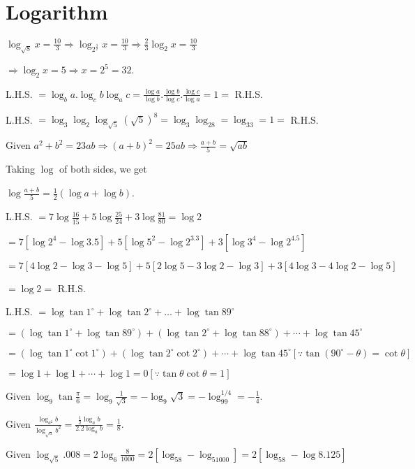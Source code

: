 \chapter{Logarithm}
\startitemize[n, 1*broad]
\item $\log_{\sqrt{8}}x = \frac{10}{3} \Rightarrow \log_{2^{\tfrac{3}{2}}}x = \frac{10}{3}\Rightarrow \frac{2}{3}\log_2x = \frac{10}{3}$

  $\Rightarrow \log_2x = 5 \Rightarrow x = 2^5 = 32.$
\item L.H.S. $= \log_ba.\log_cb\log_ac = \frac{\log a}{\log b}.\frac{\log b}{\log c}.\frac{\log c}{\log a} = 1 =$ R.H.S.
\item L.H.S. $= \log_3\log_2\log_{\sqrt{5}}(\sqrt{5})^8 = \log_3\log_28 = \log_33 = 1 =$ R.H.S.
\item Given $a^2 + b^2 = 23ab \Rightarrow (a + b)^2 = 25ab \Rightarrow \frac{a + b}{5} = \sqrt{ab}$

  Taking $\log$ of both sides, we get

  $\log\frac{a + b}{5} = \frac{1}{2}(\log a + \log b)$.
\item L.H.S. $= 7\log\frac{16}{15} + 5\log\frac{25}{24} + 3\log\frac{81}{80} = \log 2$

  $= 7[\log 2^4 - \log 3.5] + 5[\log 5^2 - \log 2^3.3] + 3[\log 3^4 - \log 2^4.5]$

  $= 7[4\log 2 - \log 3 - \log 5] + 5[2\log 5 - 3\log 2 - \log 3] + 3[4\log 3 - 4\log 2 - \log 5]$

  $= \log 2 =$ R.H.S.
\item L.H.S. $= \log\tan1^\circ + \log\tan2^\circ + \ldots + \log\tan89^\circ$

  $= (\log\tan1^\circ + \log\tan89^\circ) + (\log\tan2^\circ + \log\tan88^\circ) + \cdots + \log\tan45^\circ$

  $=(\log\tan1^\circ\cot1^\circ) + (\log\tan2^\circ\cot2^\circ) + \cdots + \log\tan45^\circ [\because \tan(90^\circ - \theta) =
  \cot\theta]$

  $= \log 1 + \log 1 + \cdots + \log 1 = 0 [\because \tan\theta\cot\theta = 1]$
\item Given $\log_9\tan\frac{\pi}{6} = \log_9\frac{1}{\sqrt{3}} = -\log_9\sqrt{3} = -\log_99^{1/4} = -\frac{1}{4}$.
\item Given $\frac{\log_{a^2}b}{\log_{\sqrt{a}}b^2} = \frac{\frac{1}{2}\log_ab}{2.2\log_ab} = \frac{1}{8}$.
\item Given $\log_{\sqrt{5}}.008 = 2\log_6\frac{8}{1000} = 2[\log_58 - \log_51000] = 2[\log_58 - \log 8.125]$

